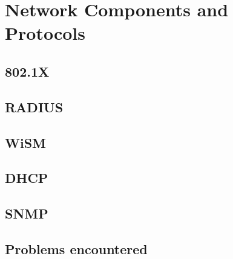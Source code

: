 
\chapter{Network Components and Protocols} %

\label{Chapter3} %



\section{802.1X}



\section{RADIUS}


\section{WiSM}



\section{DHCP}



\section{SNMP}


\section{Problems encountered}